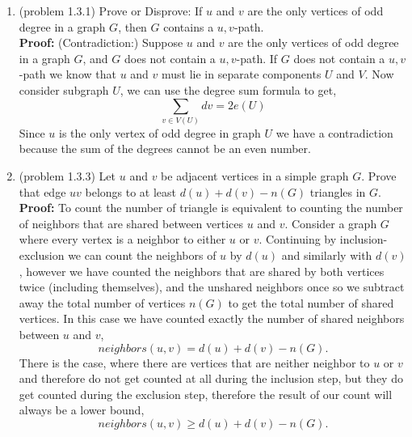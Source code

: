 \documentclass{amsart}
\begin{document}
\begin{enumerate}
\vspace{.5in}


\item (problem 1.3.1) Prove or Disprove: If $u$ and $v$ are the only vertices of odd degree in a graph $G$, then $G$ contains a $u,v$-path. \\

\textbf{Proof:} (Contradiction:) Suppose $u$ and $v$ are the only vertices of odd degree in a graph $G$, and $G$ does not contain a $u,v$-path. If $G$ does not contain a $u,v$-path we know that $u$ and $v$ must lie in separate components $U$ and $V$. Now consider subgraph $U$, we can use the degree sum formula to get,
\begin{equation*}
\sum_{v\in V(U)}d{v} = 2e(U)
\end{equation*}
Since $u$ is the only vertex of odd degree in graph $U$ we have a contradiction because the sum of the degrees cannot be an even number. 
\vspace{.5in}

\item (problem 1.3.3) Let $u$ and $v$ be adjacent vertices in a simple graph $G.$ Prove that edge $uv$ belongs to at least $d(u)+d(v)-n(G)$ triangles in $G.$\\

\textbf{Proof:} To count the number of triangle is equivalent to counting the number of neighbors that are shared between vertices $u$ and $v$. Consider a graph $G$ where every vertex is a neighbor to either $u$ or $v$. Continuing by inclusion-exclusion we can count the neighbors of $u$ by $d(u)$ and similarly with $d(v)$, however we have counted the neighbors that are shared by both vertices twice (including themselves), and the unshared neighbors once so we subtract away the total number of vertices $n(G)$ to get the total number of shared vertices. In this case we have counted exactly the number of shared neighbors between $u$ and $v$,
\begin{equation*}
neighbors(u,v) = d(u)+d(v)-n(G).
\end{equation*}
There is the case, where there are vertices that are neither neighbor to $u$ or $v$ and therefore do not get counted at all during the inclusion step, but they do get counted during the exclusion step, therefore the result of our count will always be a lower bound,
\begin{equation*}
neighbors(u,v) \geq d(u)+d(v)-n(G).
\end{equation*}


\vspace{.5in}

\end{enumerate}
\end{document}
